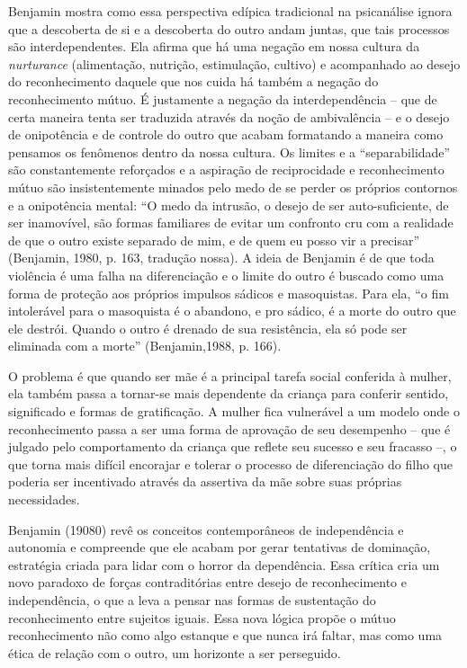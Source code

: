 Benjamin mostra como essa perspectiva edípica tradicional na psicanálise
ignora que a descoberta de si e a descoberta do outro andam juntas, que
tais processos são interdependentes. Ela afirma que há uma negação em
nossa cultura da \emph{nurturance} (alimentação, nutrição, estimulação,
cultivo) e acompanhado ao desejo do reconhecimento daquele que nos cuida
há também a negação do reconhecimento mútuo. É justamente a negação da
interdependência -- que de certa maneira tenta ser traduzida através da
noção de ambivalência -- e o desejo de onipotência e de controle do
outro que acabam formatando a maneira como pensamos os fenômenos dentro
da nossa cultura. Os limites e a ``separabilidade'' são constantemente
reforçados e a aspiração de reciprocidade e reconhecimento mútuo são
insistentemente minados pelo medo de se perder os próprios contornos e a
onipotência mental: ``O medo da intrusão, o desejo de ser
auto-suficiente, de ser inamovível, são formas familiares de evitar um
confronto cru com a realidade de que o outro existe separado de mim, e
de quem eu posso vir a precisar'' (Benjamin, 1980, p. 163, tradução
nossa). A ideia de Benjamin é de que toda violência é uma falha na
diferenciação e o limite do outro é buscado como uma forma de proteção
aos próprios impulsos sádicos e masoquistas. Para ela, ``o fim
intolerável para o masoquista é o abandono, e pro sádico, é a morte do
outro que ele destrói. Quando o outro é drenado de sua resistência, ela
só pode ser eliminada com a morte'' (Benjamin,1988, p. 166).

O problema é que quando ser mãe é a principal tarefa social conferida à
mulher, ela também passa a tornar-se mais dependente da criança para
conferir sentido, significado e formas de gratificação. A mulher fica
vulnerável a um modelo onde o reconhecimento passa a ser uma forma de
aprovação de seu desempenho -- que é julgado pelo comportamento da
criança que reflete seu sucesso e seu fracasso --, o que torna mais
difícil encorajar e tolerar o processo de diferenciação do filho que
poderia ser incentivado através da assertiva da mãe sobre suas próprias
necessidades.

Benjamin (19080) revê os conceitos contemporâneos de independência e
autonomia e compreende que ele acabam por gerar tentativas de dominação,
estratégia criada para lidar com o horror da dependência. Essa crítica
cria um novo paradoxo de forças contraditórias entre desejo de
reconhecimento e independência, o que a leva a pensar nas formas de
sustentação do reconhecimento entre sujeitos iguais. Essa nova lógica
propõe o mútuo reconhecimento não como algo estanque e que nunca irá
faltar, mas como uma ética de relação com o outro, um horizonte a ser
perseguido.


